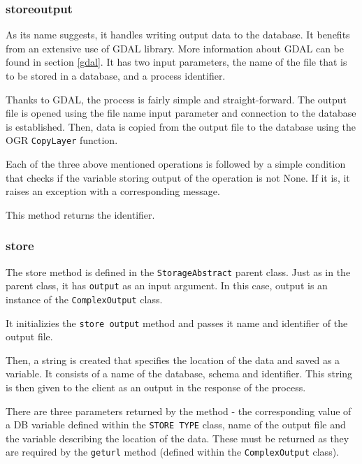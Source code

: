 \subsubsection{\textunderscore store\textunderscore output}

As its name suggests, it handles writing output data to the
database. It benefits from an extensive use of GDAL library. More
information about GDAL can be found in section \ref{gdal}. It has
two input parameters, the name of the file that is to be stored in a
database, and a process identifier.

Thanks to GDAL, the process is fairly simple and straight-forward. The
output file is opened using the file name input parameter and
connection to the database is established. Then, data is copied from
the output file to the database using the OGR \texttt{CopyLayer}
function.

Each of the three above mentioned operations is followed by a simple
condition that checks if the variable storing output of the operation
is not None. If it is, it raises an exception with a corresponding
message.

This method returns the identifier.


\subsubsection{store} 

The store method is defined in the \texttt{StorageAbstract} parent
class. Just as in the parent class, it has \texttt{output} as an input
argument. In this case, output is an instance of the \texttt{ComplexOutput} class.

It initializies the \texttt{\textunderscore store\textunderscore
  output} method and passes it name and identifier of the output file.

Then, a string is created that specifies the location of the data and
saved as a variable. It consists of a name of the database, schema and
identifier. This string is then given to the client as an output in
the  response of the process.

There are three parameters returned by the method - the corresponding
value of a DB variable defined within the \texttt{STORE\textunderscore
  TYPE} class, name of the output file and the variable describing the
location of the data. These must be returned as they are required by
the \texttt{get\textunderscore url} method (defined within the
\texttt{ComplexOutput} class).


